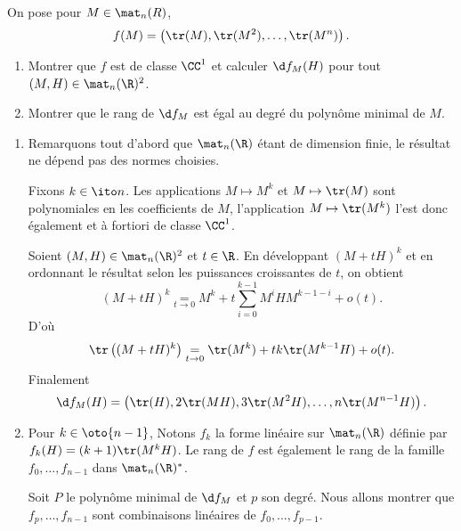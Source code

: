 \begin{enonce}
\begin{exercise}[ID={RMS 121/2 E585, Mines-Ponts PSI},subtitle={},tags={}]
On pose pour $M\in\mat_n(R)$,
\begin{equation*}
    f(M)=\left( \tr(M),\tr(M^2),\dotsc,\tr(M^n)\right).
\end{equation*}
\begin{enumerate}
    \item Montrer que $f$ est de classe $\CC^1$ et calculer $\d f_M(H)$ pour tout $(M,H)\in\mat_n(\R)^2$.
    \item Montrer que le rang de $\d f_M$ est égal au degré du polynôme minimal de $M$.
\end{enumerate}
\end{exercise}
\begin{solution}
\begin{enumerate}
    \item Remarquons tout d'abord que $\mat_n(\R)$ étant de dimension finie, le résultat ne dépend pas des normes choisies.

Fixons $k\in\ito n$.
Les applications $M\mapsto M^k$ et $M\mapsto \tr(M)$ sont polynomiales en les coefficients de $M$, l'application $M\mapsto\tr(M^k)$ l'est donc également et à fortiori de classe $\CC^1$.

Soient $(M,H)\in\mat_n(\R)^2$ et $t\in\R$. En développant $(M+tH)^k$ et en ordonnant le résultat selon les puissances croissantes de $t$, on obtient
\begin{equation*}
    (M+tH)^k \underset{t\to0}= M^k + t \sum_{i=0}^{k-1} M^iH M^{k-1-i} + o(t).
\end{equation*}
D'où
\begin{equation*}
    \tr\left((M+tH)^k\right) \underset{t\to0}= \tr(M^k) + t k\tr(M^{k-1}H) + o(t).
\end{equation*}
Finalement
\begin{equation*}
    \d f_M(H) = \left( \tr(H),2\tr(MH),3\tr(M^2H),\dotsc, n\tr(M^{n-1}H)\right).
\end{equation*}



\item
    Pour $k\in\oto{n-1}$, Notons $f_k$ la forme linéaire sur $\mat_n(\R)$ définie par $f_k(H)= (k+1)\tr(M^k H)$. Le rang de $f$ est également le rang de la famille $f_0,\dotsc, f_{n-1}$ dans $\mat_n(\R)^*$.

Soit $P$ le polynôme minimal de $\d f_M$ et $p$ son degré.
Nous allons montrer que $f_{p},\dotsc,f_{n-1}$ sont combinaisons linéaires de $f_0,\dotsc,f_{p-1}$.


\end{enumerate}
\end{solution}
\end{enonce}
